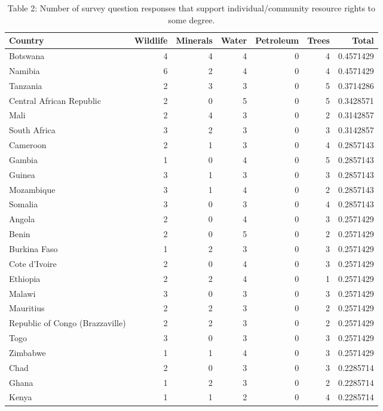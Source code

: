 \documentclass[
  12pt,
]{article}
\begin{document}
\begin{table}

\caption{\label{tab:unnamed-chunk-8}Table 2: Number of survey question responses that support individual/community resource rights to some degree.}
\centering
\begin{tabular}[t]{l|r|r|r|r|r|r}
\hline
Country & Wildlife & Minerals & Water & Petroleum & Trees & Total\\
\hline
Botswana & 4 & 4 & 4 & 0 & 4 & 0.4571429\\
\hline
Namibia & 6 & 2 & 4 & 0 & 4 & 0.4571429\\
\hline
Tanzania & 2 & 3 & 3 & 0 & 5 & 0.3714286\\
\hline
Central African Republic & 2 & 0 & 5 & 0 & 5 & 0.3428571\\
\hline
Mali & 2 & 4 & 3 & 0 & 2 & 0.3142857\\
\hline
South Africa & 3 & 2 & 3 & 0 & 3 & 0.3142857\\
\hline
Cameroon & 2 & 1 & 3 & 0 & 4 & 0.2857143\\
\hline
Gambia & 1 & 0 & 4 & 0 & 5 & 0.2857143\\
\hline
Guinea & 3 & 1 & 3 & 0 & 3 & 0.2857143\\
\hline
Mozambique & 3 & 1 & 4 & 0 & 2 & 0.2857143\\
\hline
Somalia & 3 & 0 & 3 & 0 & 4 & 0.2857143\\
\hline
Angola & 2 & 0 & 4 & 0 & 3 & 0.2571429\\
\hline
Benin & 2 & 0 & 5 & 0 & 2 & 0.2571429\\
\hline
Burkina Faso & 1 & 2 & 3 & 0 & 3 & 0.2571429\\
\hline
Cote d'Ivoire & 2 & 0 & 4 & 0 & 3 & 0.2571429\\
\hline
Ethiopia & 2 & 2 & 4 & 0 & 1 & 0.2571429\\
\hline
Malawi & 3 & 0 & 3 & 0 & 3 & 0.2571429\\
\hline
Mauritius & 2 & 2 & 3 & 0 & 2 & 0.2571429\\
\hline
Republic of Congo (Brazzaville) & 2 & 2 & 3 & 0 & 2 & 0.2571429\\
\hline
Togo & 3 & 0 & 3 & 0 & 3 & 0.2571429\\
\hline
Zimbabwe & 1 & 1 & 4 & 0 & 3 & 0.2571429\\
\hline
Chad & 2 & 0 & 3 & 0 & 3 & 0.2285714\\
\hline
Ghana & 1 & 2 & 3 & 0 & 2 & 0.2285714\\
\hline
Kenya & 1 & 1 & 2 & 0 & 4 & 0.2285714\\

\end{tabular}
\end{table}
\end{document}
